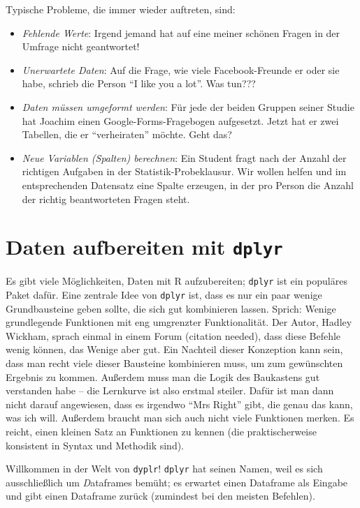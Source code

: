 \documentclass[12pt,ngerman,paper=a4,pagesize,DIV=13]{scrreprt}
\providecommand{\tightlist}{%
  \setlength{\itemsep}{0pt}\setlength{\parskip}{0pt}}
\begin{document}
Typische Probleme, die immer wieder auftreten, sind:

\begin{itemize}
\tightlist
\item
  \emph{Fehlende Werte}: Irgend jemand hat auf eine meiner schönen
  Fragen in der Umfrage nicht geantwortet!
\item
  \emph{Unerwartete Daten}: Auf die Frage, wie viele Facebook-Freunde er
  oder sie habe, schrieb die Person \enquote{I like you a lot}. Was
  tun???
\item
  \emph{Daten müssen umgeformt werden}: Für jede der beiden Gruppen
  seiner Studie hat Joachim einen Google-Forms-Fragebogen aufgesetzt.
  Jetzt hat er zwei Tabellen, die er \enquote{verheiraten} möchte. Geht
  das?
\item
  \emph{Neue Variablen (Spalten) berechnen}: Ein Student fragt nach der
  Anzahl der richtigen Aufgaben in der Statistik-Probeklausur. Wir
  wollen helfen und im entsprechenden Datensatz eine Spalte erzeugen, in
  der pro Person die Anzahl der richtig beantworteten Fragen steht.
\end{itemize}

\hypertarget{daten-aufbereiten-mit-dplyr}{%
\section{\texorpdfstring{Daten aufbereiten mit
\texttt{dplyr}}{Daten aufbereiten mit dplyr}}\label{daten-aufbereiten-mit-dplyr}}

Es gibt viele Möglichkeiten, Daten mit R aufzubereiten; \texttt{dplyr}
ist ein populäres Paket dafür. Eine zentrale Idee von \texttt{dplyr}
ist, dass es nur ein paar wenige Grundbausteine geben sollte, die sich
gut kombinieren lassen. Sprich: Wenige grundlegende Funktionen mit eng
umgrenzter Funktionalität. Der Autor, Hadley Wickham, sprach einmal in
einem Forum (citation needed), dass diese Befehle wenig können, das
Wenige aber gut. Ein Nachteil dieser Konzeption kann sein, dass man
recht viele dieser Bausteine kombinieren muss, um zum gewünschten
Ergebnis zu kommen. Außerdem muss man die Logik des Baukastens gut
verstanden habe -- die Lernkurve ist also erstmal steiler. Dafür ist man
dann nicht darauf angewiesen, dass es irgendwo \enquote{Mrs Right} gibt,
die genau das kann, was ich will. Außerdem braucht man sich auch nicht
viele Funktionen merken. Es reicht, einen kleinen Satz an Funktionen zu
kennen (die praktischerweise konsistent in Syntax und Methodik sind).

Willkommen in der Welt von \texttt{dyplr}! \texttt{dplyr} hat seinen
Namen, weil es sich ausschließlich um \emph{D}ataframes bemüht; es
erwartet einen Dataframe als Eingabe und gibt einen Dataframe zurück
(zumindest bei den meisten Befehlen).
\end{document}
